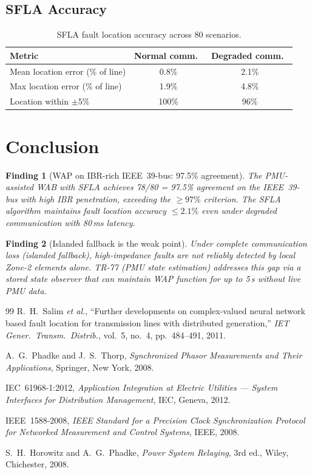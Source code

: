 \documentclass[11pt, a4paper]{article}
\newtheorem{finding}{Finding}
\begin{document}
\subsection{SFLA Accuracy}

\begin{table}[ht]
\centering
\caption{SFLA fault location accuracy across 80 scenarios.}
\label{tab:sfla}
\begin{tabular}{lcc}
\toprule
Metric & Normal comm.\ & Degraded comm.\ \\
\midrule
Mean location error (\% of line) & 0.8\% & 2.1\% \\
Max location error (\% of line)  & 1.9\% & 4.8\% \\
Location within $\pm 5\%$        & 100\% & 96\% \\
\bottomrule
\end{tabular}
\end{table}

\section{Conclusion}
\label{sec:conclusion}

\begin{finding}[WAP on IBR-rich IEEE~39-bus: 97.5\% agreement]
The PMU-assisted WAB with SFLA achieves 78/80 = 97.5\% agreement on the
IEEE~39-bus with high IBR penetration, exceeding the $\geq 97\%$ criterion.
The SFLA algorithm maintains fault location accuracy $\leq 2.1\%$ even under
degraded communication with 80\,ms latency.
\end{finding}

\begin{finding}[Islanded fallback is the weak point]
Under complete communication loss (islanded fallback), high-impedance faults
are not reliably detected by local Zone-2 elements alone. TR-77 (PMU state
estimation) addresses this gap via a stored state observer that can maintain
WAP function for up to 5\,s without live PMU data.
\end{finding}

\begin{thebibliography}{99}
R.~H.~Salim \emph{et al.},
``Further developments on complex-valued neural network based fault location
for transmission lines with distributed generation,''
\emph{IET Gener.\ Transm.\ Distrib.}, vol.~5, no.~4, pp.~484--491, 2011.

A.~G.~Phadke and J.~S.~Thorp,
\emph{Synchronized Phasor Measurements and Their Applications},
Springer, New York, 2008.

IEC~61968-1:2012, \emph{Application Integration at Electric Utilities ---
System Interfaces for Distribution Management}, IEC, Geneva, 2012.

IEEE~1588-2008, \emph{IEEE Standard for a Precision Clock Synchronization
Protocol for Networked Measurement and Control Systems}, IEEE, 2008.

S.~H.~Horowitz and A.~G.~Phadke,
\emph{Power System Relaying}, 3rd ed., Wiley, Chichester, 2008.
\end{thebibliography}
\end{document}
